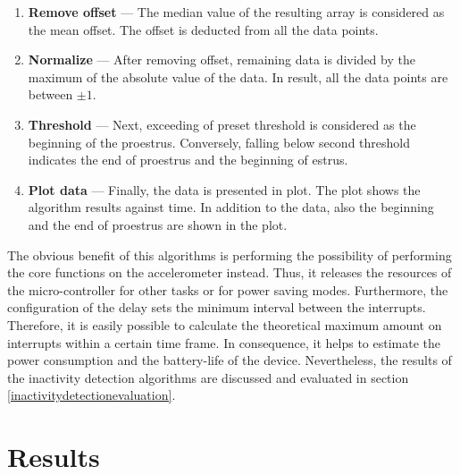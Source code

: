 \documentclass[english,12pt,a4paper,pdftex,elec,utf8]{aaltothesis}
\begin{document}
\begin{enumerate}
\item \textbf{Remove offset} --- The median value of the resulting array is considered as the mean offset. The offset is deducted from all the data points.

\item \textbf{Normalize} --- After removing offset, remaining data is divided by the maximum of the absolute value of the data. In result, all the data points are between $\pm 1$.

\item \textbf{Threshold} --- Next, exceeding of preset threshold is considered as the beginning of the proestrus. Conversely, falling below second threshold indicates the end of proestrus and the beginning of estrus.

\item \textbf{Plot data} --- Finally, the data is presented in plot. The plot shows the algorithm results against time. In addition to the data, also the beginning and the end of proestrus are shown in the plot.


\end{enumerate}

The obvious benefit of this algorithms is performing the possibility of performing the core functions on the accelerometer instead. Thus, it releases the resources of the micro-controller for other tasks or for power saving modes. Furthermore, the configuration of the delay sets the minimum interval between the interrupts. Therefore, it is easily possible to calculate the theoretical maximum amount on interrupts within a certain time frame. In consequence, it helps to estimate the power consumption and the battery-life of the device. Nevertheless, the results of the inactivity detection algorithms are discussed and evaluated in section \ref{inactivitydetectionevaluation}.


\clearpage
\section{Results} \label{resultssection}
\end{document}
